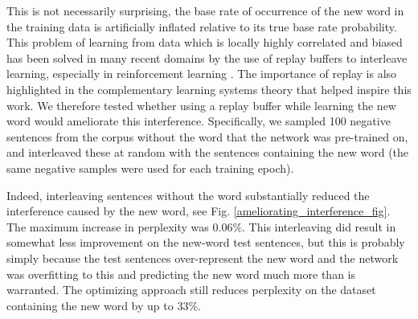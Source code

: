 \documentclass{article}
\begin{document}
This is not necessarily surprising, the base rate of occurrence of the new word in the training data is artificially inflated relative to its true base rate probability. This problem of learning from data which is locally highly correlated and biased has been solved in many recent domains by the use of replay buffers to interleave learning, especially in reinforcement learning \citep[e.g]{Mnih2015}. The importance of replay is also highlighted in the complementary learning systems theory \citep{Kumaran2016} that helped inspire this work. We therefore tested whether using a replay buffer while learning the new word would ameliorate this interference. Specifically, we sampled 100 negative sentences from the corpus without the word that the network was pre-trained on, and interleaved these at random with the sentences containing the new word (the same negative samples were used for each training epoch). \par
Indeed, interleaving sentences without the word substantially reduced the interference caused by the new word, see Fig. \ref{ameliorating_interference_fig}. The maximum increase in perplexity was \(0.06\%\). This interleaving did result in somewhat less improvement on the new-word test sentences, but this is probably simply because the test sentences over-represent the new word and the network was overfitting to this and predicting the new word much more than is warranted. The optimizing approach still reduces perplexity on the dataset containing the new word by up to 33\%. \par
\end{document}
